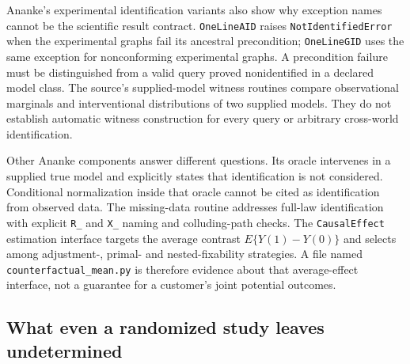 Ananke's experimental identification variants also show why exception names
cannot be the scientific result contract. \texttt{OneLineAID} raises
\texttt{NotIdentifiedError} when the experimental graphs fail its ancestral
precondition; \texttt{OneLineGID} uses the same exception for nonconforming
experimental graphs. A precondition failure must be distinguished from a
valid query proved nonidentified in a declared model class. The source's
supplied-model witness routines compare observational marginals and
interventional distributions of two supplied models. They do not establish
automatic witness construction for every query or arbitrary cross-world
identification.~\citep{exec18_pyid_one_line}

Other Ananke components answer different questions. Its oracle intervenes in a
supplied true model and explicitly states that identification is not considered.
Conditional normalization inside that oracle cannot be cited as identification
from observed data. The missing-data routine addresses full-law identification
with explicit \texttt{R\_} and \texttt{X\_} naming and colluding-path checks.
The \texttt{CausalEffect} estimation interface targets the average contrast
$E\{Y(1)-Y(0)\}$ and selects among adjustment-, primal- and nested-fixability
strategies. A file named \texttt{counterfactual\_mean.py} is therefore evidence
about that average-effect interface, not a guarantee for a customer's joint
potential outcomes.~\citep{exec18_pyid_oracle,exec18_pyid_missing,exec18_pyid_mean}

\subsection{What even a randomized study leaves undetermined}
\label{exec18:pyid-coupling}

